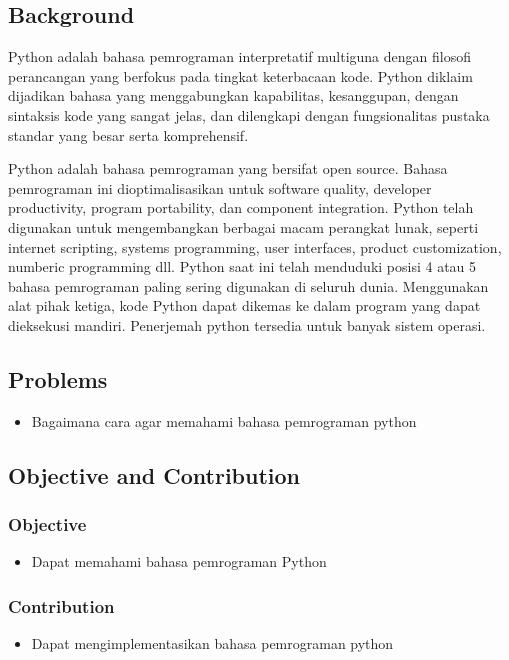 \subsection{Background}
Python adalah bahasa pemrograman interpretatif multiguna dengan filosofi perancangan yang berfokus pada tingkat keterbacaan kode. Python diklaim dijadikan bahasa yang menggabungkan kapabilitas, kesanggupan, dengan sintaksis kode yang sangat jelas, dan dilengkapi dengan fungsionalitas pustaka standar yang besar serta komprehensif.
\par
Python adalah bahasa pemrograman yang bersifat open source. Bahasa pemrograman ini dioptimalisasikan untuk software quality, developer productivity, program portability, dan component integration. Python telah digunakan untuk mengembangkan berbagai macam perangkat lunak, seperti internet scripting, systems programming, user interfaces, product customization, numberic programming dll. Python saat ini telah menduduki posisi 4 atau 5 bahasa pemrograman paling sering digunakan di seluruh dunia. Menggunakan alat pihak ketiga, kode Python dapat dikemas ke dalam program yang dapat dieksekusi mandiri. Penerjemah python tersedia untuk banyak sistem operasi.
\subsection{Problems}
\begin{itemize}
\item Bagaimana cara agar memahami bahasa pemrograman python
\end{itemize}
\subsection{Objective and Contribution}
\subsubsection{Objective}
\begin{itemize}
\item Dapat memahami bahasa pemrograman Python
\end{itemize}
\subsubsection{Contribution}
\begin{itemize}
\item Dapat mengimplementasikan bahasa pemrograman python
\end{itemize}

